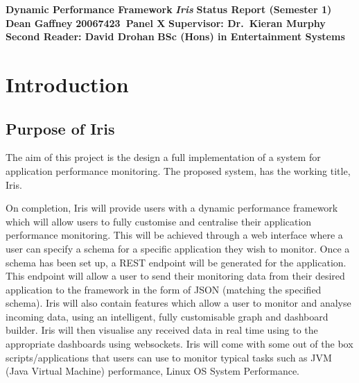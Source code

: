 \documentclass[12pt,a4paper,titlepage]{report}
\newcommand\AcademicTitle{Dynamic Performance Framework}
\newcommand\CommericalTitle{Iris}
\newcommand\Author{Dean Gaffney}
\newcommand\StudentID{20067423}
\newcommand\Report{Status Report (Semester 1)}
\newcommand\Reader{Supervisor: Dr.~Kieran Murphy}
\newcommand\SecondReader{Second Reader: David Drohan}
\begin{document}

\thispagestyle{empty}
\begin{center}
\mbox{}\vfill
{\fontsize{18pt}{20pt}\selectfont \bfseries \AcademicTitle}
\vfill
{\fontsize{14pt}{20pt}\selectfont \bfseries\itshape \CommericalTitle}
\vfill
{\fontsize{12pt}{20pt}\selectfont \bfseries \Report}
\vfill
{\fontsize{14pt}{20pt}\selectfont \bfseries \Author}
\vfill
{\fontsize{14pt}{20pt}\selectfont \bfseries \StudentID\ Panel X}
\vfill
{\fontsize{14pt}{20pt}\selectfont \bfseries \Reader}
\vfill
{\fontsize{14pt}{20pt}\selectfont \bfseries \SecondReader}
\vfill
{\fontsize{14pt}{20pt}\selectfont \bfseries BSc (Hons) in Entertainment Systems}
\vfill
\end{center}
\clearpage

\tableofcontents
\listoftables
\listoffigures

\clearpage
{}
\setcounter{page}{1}


\chapter{Introduction}

\section{Purpose of Iris}

The aim of this project is the design a full implementation of a system for application performance monitoring. The proposed system, has the working title,  Iris. 

On completion, Iris will provide users with a dynamic performance framework which will allow users to fully customise and centralise their application performance monitoring. This will be achieved through a web interface where a user can specify a schema for a specific application they wish to monitor. Once a schema has been set up, a REST endpoint will be generated for the application. This endpoint will allow a user to send their monitoring data from their desired application to the framework in the form of JSON (matching the specified schema). Iris will also contain features which allow a user to monitor and analyse incoming data, using an intelligent, fully customisable graph and dashboard builder. Iris will then visualise any received data in real time using to the appropriate dashboards using websockets. Iris will come with some out of the box scripts/applications that users can use to monitor typical tasks such as JVM (Java Virtual Machine) performance, Linux OS System Performance.
\end{document}
